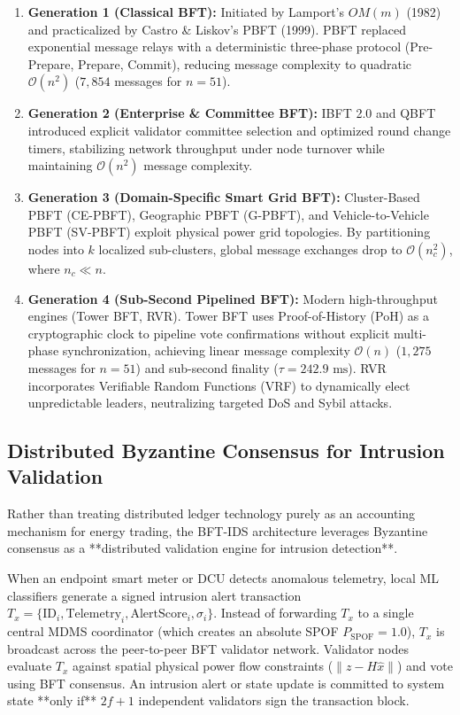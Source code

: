 \documentclass[10pt,twocolumn,journal]{IEEEtran}
\begin{document}
\begin{enumerate}[leftmargin=*]
    \item \textbf{Generation 1 (Classical BFT):} Initiated by Lamport's $OM(m)$ (1982) and practicalized by Castro \& Liskov's PBFT (1999). PBFT replaced exponential message relays with a deterministic three-phase protocol (Pre-Prepare, Prepare, Commit), reducing message complexity to quadratic $\mathcal{O}(n^2)$ ($7,854$ messages for $n=51$).
    \item \textbf{Generation 2 (Enterprise & Committee BFT):} IBFT 2.0 and QBFT introduced explicit validator committee selection and optimized round change timers, stabilizing network throughput under node turnover while maintaining $\mathcal{O}(n^2)$ message complexity.
    \item \textbf{Generation 3 (Domain-Specific Smart Grid BFT):} Cluster-Based PBFT (CE-PBFT), Geographic PBFT (G-PBFT), and Vehicle-to-Vehicle PBFT (SV-PBFT) exploit physical power grid topologies. By partitioning nodes into $k$ localized sub-clusters, global message exchanges drop to $\mathcal{O}(n_c^2)$, where $n_c \ll n$.
    \item \textbf{Generation 4 (Sub-Second Pipelined BFT):} Modern high-throughput engines (Tower BFT, RVR). Tower BFT uses Proof-of-History (PoH) as a cryptographic clock to pipeline vote confirmations without explicit multi-phase synchronization, achieving linear message complexity $\mathcal{O}(n)$ ($1,275$ messages for $n=51$) and sub-second finality ($\tau = 242.9\text{ ms}$). RVR incorporates Verifiable Random Functions (VRF) to dynamically elect unpredictable leaders, neutralizing targeted DoS and Sybil attacks.
\end{enumerate}

\subsection{Distributed Byzantine Consensus for Intrusion Validation}
Rather than treating distributed ledger technology purely as an accounting mechanism for energy trading, the BFT-IDS architecture leverages Byzantine consensus as a **distributed validation engine for intrusion detection**.

When an endpoint smart meter or DCU detects anomalous telemetry, local ML classifiers generate a signed intrusion alert transaction $T_x = \{\text{ID}_i, \text{Telemetry}_i, \text{AlertScore}_i, \sigma_i\}$. Instead of forwarding $T_x$ to a single central MDMS coordinator (which creates an absolute SPOF $P_{\text{SPOF}} = 1.0$), $T_x$ is broadcast across the peer-to-peer BFT validator network. Validator nodes evaluate $T_x$ against spatial physical power flow constraints ($\|z - H\hat{x}\|$) and vote using BFT consensus. An intrusion alert or state update is committed to system state **only if** $2f+1$ independent validators sign the transaction block.
\end{document}
